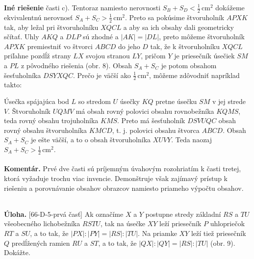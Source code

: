 \documentclass[11pt,a4paper,oneside,final]{book}
\newcommand{\kom}{\textbf{Komentár.} }
\newcommand{\ul}{\textbf{Úloha.} }
\begin{document}
\textbf{Iné riešenie} časti c). Tentoraz namiesto nerovnosti $S_B + S_ D < \frac{1}{2}$\,cm$^2$ dokážeme ekvivalentnú nerovnosť $S_A +S_C >\frac{1}{2}$\,cm$^2$. Preto sa pokúsime  štvoruholník $APXK$ tak, aby ležal pri štvoruholníku $XQCL$ a aby sa ich obsahy dali geometricky sčítať. Uhly $AKQ$ a $DLP$ sú zhodné a $| AK | = | DL |$, preto môžeme štvoruholník $APXK$ premiestniť vo štvorci $ABCD$ do jeho  $D$ tak, že k štvoruholníku $XQCL$ priľahne pozdĺž strany $LX$ svojou stranou $LY$, pričom $Y$ je priesečník úsečiek $SM$ a $PL$ z pôvodného riešenia (obr. 8). Obsah $S_A + S_C$ je potom obsahom šesťuholníka $DSYXQC$. Prečo je väčší ako $\frac{1}{2}$\,cm$^2$, môžeme zdôvodniť napríklad takto:

Úsečka spájajúca bod $L$ so stredom $U$ úsečky $KQ$ pretne úsečku $SM$ v jej strede $V$. Štvoruholník $UQMV$ má obsah rovný polovici obsahu rovnobežníka $KQMS$, teda rovný obsahu trojuholníka $KMS$. Preto má šesťuholník $DSV UQC$ obsah rovný obsahu štvoruholníka $KMCD$, t. j. polovici obsahu štvorca $ABCD$. Obsah $S_A +S_C$ je ešte väčší, a to o obsah štvoruholníka $XUVY$. Teda naozaj $S_A + S_C >\frac{1}{2}$\,cm$^2$.\\
\\
\kom Prvé dve časti sú príjemným úvahovým rozohriatím k časti tretej, ktorá vyžaduje trochu viac invencie. Demonštruje však zajímavý prístup k riešeniu a porovnávanie obsahov obrazcov namiesto priameho výpočtu obsahov.\\
\\
\begin{tcolorbox}[breakable,notitle,boxrule=0pt,colback=light-gray,colframe=light-gray]\ul [66-D-5-prvá časť] Ak označíme $X$ a $Y$ postupne stredy základní $RS$ a $TU$ všeobecného lichobežníka $RSTU$, tak na úsečke $XY$ leží priesečník $P$ uhlopriečok $RT$ a $SU$, a to tak, že $|PX| : |PY | = |RS| : |TU|$. Na priamke $XY$ leží tiež priesečník $Q$ predĺžených ramien $RU$ a $ST$, a to tak, že $|QX| : |QY | = |RS| : |TU|$ (obr. 9). Dokážte.

\end{tcolorbox}
\end{document}
